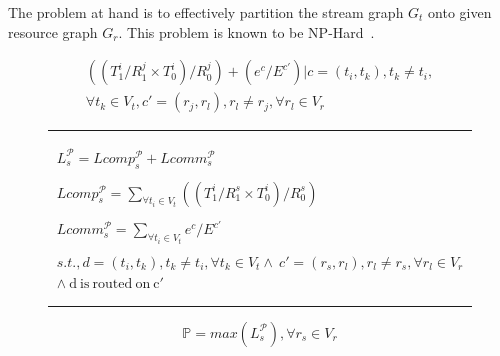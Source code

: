 \documentclass[10pt, conference, compsocconf, reqno]{IEEEtran}
\begin{document}

The problem at hand is to effectively partition the stream graph $G_t$ onto
given resource graph $G_r$. This problem is known to be
NP-Hard~\cite{vsar89}. %


\begin{figure}[ht!]
\begin{scriptsize}

  \begin{equation}
    \label{eq:3}
    \begin{array}{c}

      ((T^i_1/R^j_1\times T^i_0)/R^j_0)
      + (e^c/E^{c'}) | c = (t_i,t_k), t_k \neq t_i, \\ \forall t_k \in V_t, c' =
      (r_j,r_l), r_l \neq r_j, \forall r_l \in V_r

    \end{array}
  \end{equation}

  \rule{8.6cm}{0.4pt}

  \begin{equation}
    \label{eq:1}
    \begin{array}{c}
      L^{\mathcal{P}}_s = Lcomp^{\mathcal{P}}_s +
      Lcomm^{\mathcal{P}}_s\\
      \\Lcomp^{\mathcal{P}}_s =
      \sum_{\forall t_i \in V_t} ((T^i_1/R^s_1\times T^i_0)/R^s_0)\\
      \\Lcomm^{\mathcal{P}}_s =
      \sum_{\forall t_i \in V_t} e^c / E^{c'}\\
      \\s.t., d = (t_i,t_k), t_k \neq t_i, \forall t_k
      \in V_t \wedge\  c' = (r_s,r_l), r_l \neq r_s, \forall r_l \in V_r \\
      \wedge\ \mathrm{d\ is\ routed\ on\ c'}
    \end{array}
  \end{equation}

  \rule{8.6cm}{0.4pt}

  \begin{equation}
    \label{eq:2}
    \mathbb{P} = max ({L^{\mathcal{P}}_s}), \forall r_s \in V_r
  \end{equation}

\end{scriptsize}
\end{figure}
\end{document}
